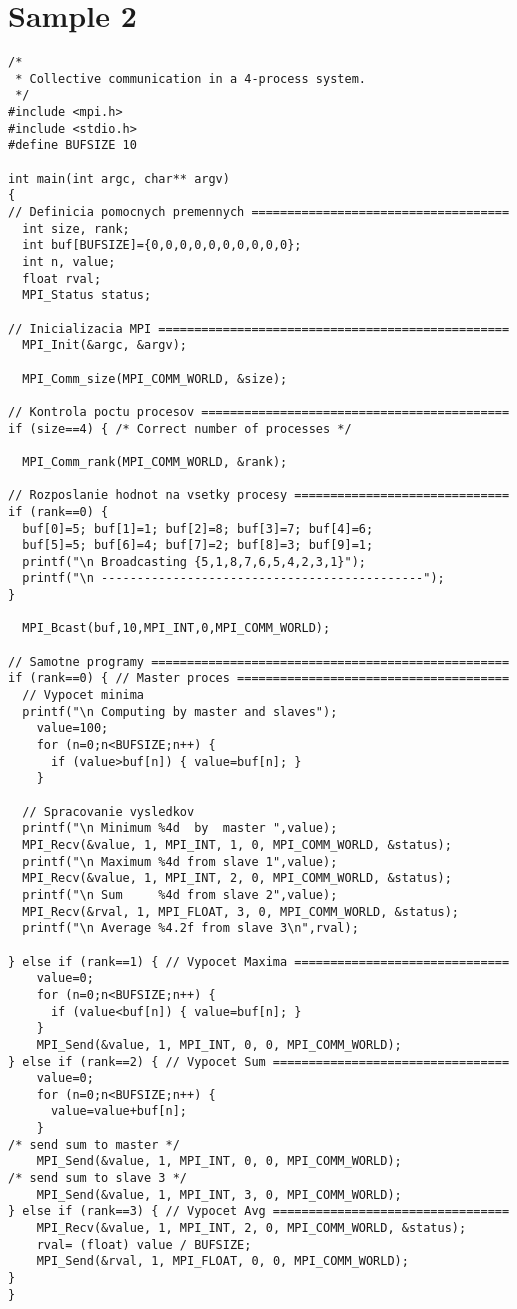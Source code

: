 \documentclass{report}
\begin{document}
\section{Sample 2}
\begin{lstlisting}
/* 
 * Collective communication in a 4-process system. 
 */ 
#include <mpi.h>
#include <stdio.h>
#define BUFSIZE 10

int main(int argc, char** argv)
{ 
// Definicia pomocnych premennych ====================================
  int size, rank;
  int buf[BUFSIZE]={0,0,0,0,0,0,0,0,0,0};
  int n, value;
  float rval;
  MPI_Status status;

// Inicializacia MPI =================================================
  MPI_Init(&argc, &argv);

  MPI_Comm_size(MPI_COMM_WORLD, &size);

// Kontrola poctu procesov ===========================================
if (size==4) { /* Correct number of processes */

  MPI_Comm_rank(MPI_COMM_WORLD, &rank); 

// Rozposlanie hodnot na vsetky procesy ==============================
if (rank==0) {
  buf[0]=5; buf[1]=1; buf[2]=8; buf[3]=7; buf[4]=6; 
  buf[5]=5; buf[6]=4; buf[7]=2; buf[8]=3; buf[9]=1;
  printf("\n Broadcasting {5,1,8,7,6,5,4,2,3,1}"); 
  printf("\n ---------------------------------------------");
}
 
  MPI_Bcast(buf,10,MPI_INT,0,MPI_COMM_WORLD);

// Samotne programy ==================================================
if (rank==0) { // Master proces ======================================
  // Vypocet minima
  printf("\n Computing by master and slaves"); 
    value=100; 
    for (n=0;n<BUFSIZE;n++) {
      if (value>buf[n]) { value=buf[n]; }
    }   

  // Spracovanie vysledkov
  printf("\n Minimum %4d  by  master ",value); 
  MPI_Recv(&value, 1, MPI_INT, 1, 0, MPI_COMM_WORLD, &status);
  printf("\n Maximum %4d from slave 1",value); 
  MPI_Recv(&value, 1, MPI_INT, 2, 0, MPI_COMM_WORLD, &status);
  printf("\n Sum     %4d from slave 2",value); 
  MPI_Recv(&rval, 1, MPI_FLOAT, 3, 0, MPI_COMM_WORLD, &status);
  printf("\n Average %4.2f from slave 3\n",rval); 
 
} else if (rank==1) { // Vypocet Maxima ==============================
    value=0; 
    for (n=0;n<BUFSIZE;n++) {
      if (value<buf[n]) { value=buf[n]; }
    }   
    MPI_Send(&value, 1, MPI_INT, 0, 0, MPI_COMM_WORLD);
} else if (rank==2) { // Vypocet Sum =================================
    value=0; 
    for (n=0;n<BUFSIZE;n++) {
      value=value+buf[n]; 
    }   
/* send sum to master */
    MPI_Send(&value, 1, MPI_INT, 0, 0, MPI_COMM_WORLD);
/* send sum to slave 3 */
    MPI_Send(&value, 1, MPI_INT, 3, 0, MPI_COMM_WORLD);
} else if (rank==3) { // Vypocet Avg =================================
    MPI_Recv(&value, 1, MPI_INT, 2, 0, MPI_COMM_WORLD, &status);
    rval= (float) value / BUFSIZE; 
    MPI_Send(&rval, 1, MPI_FLOAT, 0, 0, MPI_COMM_WORLD);
}
} 


\end{lstlisting}
\end{document}
